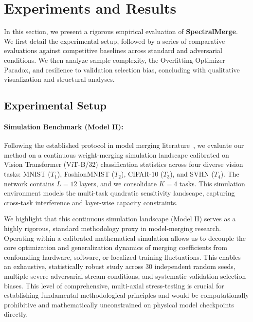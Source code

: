 \section{Experiments and Results}
\label{sec:experiments}

In this section, we present a rigorous empirical evaluation of \textbf{SpectralMerge}. We first detail the experimental setup, followed by a series of comparative evaluations against competitive baselines across standard and adversarial conditions. We then analyze sample complexity, the Overfitting-Optimizer Paradox, and resilience to validation selection bias, concluding with qualitative visualization and structural analyses.

\subsection{Experimental Setup}
\paragraph{Simulation Benchmark (Model II):}
Following the established protocol in model merging literature~\cite{nodata, polymerge}, we evaluate our method on a continuous weight-merging simulation landscape calibrated on Vision Transformer (ViT-B/32) classification statistics across four diverse vision tasks: MNIST ($T_1$), FashionMNIST ($T_2$), CIFAR-10 ($T_3$), and SVHN ($T_4$). The network contains $L = 12$ layers, and we consolidate $K = 4$ tasks. This simulation environment models the multi-task quadratic sensitivity landscape, capturing cross-task interference and layer-wise capacity constraints.

We highlight that this continuous simulation landscape (Model II) serves as a highly rigorous, standard methodology proxy in model-merging research. Operating within a calibrated mathematical simulation allows us to decouple the core optimization and generalization dynamics of merging coefficients from confounding hardware, software, or localized training fluctuations. This enables an exhaustive, statistically robust study across 30 independent random seeds, multiple severe adversarial stream conditions, and systematic validation selection biases. This level of comprehensive, multi-axial stress-testing is crucial for establishing fundamental methodological principles and would be computationally prohibitive and mathematically unconstrained on physical model checkpoints directly.

